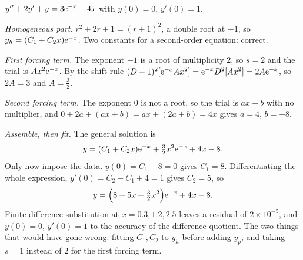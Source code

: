 \begin{worked}
$y''+2y'+y=3\mathrm{e}^{-x}+4x$ with $y(0)=0$, $y'(0)=1$.

\emph{Homogeneous part.} $r^{2}+2r+1=(r+1)^{2}$, a double root at $-1$, so $y_h=(C_1+C_2x)\mathrm{e}^{-x}$. Two constants for a second-order equation: correct.

\emph{First forcing term.} The exponent $-1$ is a root of multiplicity $2$, so $s=2$ and the trial is $Ax^{2}\mathrm{e}^{-x}$. By the shift rule $(D+1)^{2}[\mathrm{e}^{-x}Ax^{2}]=\mathrm{e}^{-x}D^{2}[Ax^{2}]=2A\mathrm{e}^{-x}$, so $2A=3$ and $A=\tfrac32$.

\emph{Second forcing term.} The exponent $0$ is not a root, so the trial is $ax+b$ with no multiplier, and $0+2a+(ax+b)=ax+(2a+b)=4x$ gives $a=4$, $b=-8$.

\emph{Assemble, then fit.} The general solution is
\[y=(C_1+C_2x)\mathrm{e}^{-x}+\tfrac32x^{2}\mathrm{e}^{-x}+4x-8.\]
Only now impose the data. $y(0)=C_1-8=0$ gives $C_1=8$. Differentiating the whole expression, $y'(0)=C_2-C_1+4=1$ gives $C_2=5$, so
\[y=\Bigl(8+5x+\tfrac32x^{2}\Bigr)\mathrm{e}^{-x}+4x-8.\]
Finite-difference substitution at $x=0.3,1.2,2.5$ leaves a residual of $2\times10^{-5}$, and $y(0)=0$, $y'(0)=1$ to the accuracy of the difference quotient. The two things that would have gone wrong: fitting $C_1,C_2$ to $y_h$ before adding $y_p$, and taking $s=1$ instead of $2$ for the first forcing term.
\end{worked}

\begin{center}
\end{center}

